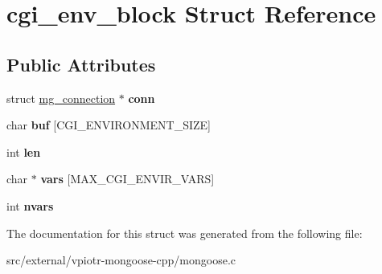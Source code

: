 \hypertarget{structcgi__env__block}{\section{cgi\-\_\-env\-\_\-block Struct Reference}
\label{structcgi__env__block}
}
\subsection*{Public Attributes}
\begin{DoxyCompactItemize}
\item 
\hypertarget{structcgi__env__block_a690d939b7e443d589d89803b36a1a20d}{struct \hyperlink{structmg__connection}{mg\-\_\-connection} $\ast$ {\bfseries conn}}\label{structcgi__env__block_a690d939b7e443d589d89803b36a1a20d}

\item 
\hypertarget{structcgi__env__block_acde439ca8be77fbb1061e760e3688d8d}{char {\bfseries buf} \mbox{[}C\-G\-I\-\_\-\-E\-N\-V\-I\-R\-O\-N\-M\-E\-N\-T\-\_\-\-S\-I\-Z\-E\mbox{]}}\label{structcgi__env__block_acde439ca8be77fbb1061e760e3688d8d}

\item 
\hypertarget{structcgi__env__block_a6455757faba75fde382e24e5bea25cb5}{int {\bfseries len}}\label{structcgi__env__block_a6455757faba75fde382e24e5bea25cb5}

\item 
\hypertarget{structcgi__env__block_a292f1d13d56cd7872284da7221bbd8bb}{char $\ast$ {\bfseries vars} \mbox{[}M\-A\-X\-\_\-\-C\-G\-I\-\_\-\-E\-N\-V\-I\-R\-\_\-\-V\-A\-R\-S\mbox{]}}\label{structcgi__env__block_a292f1d13d56cd7872284da7221bbd8bb}

\item 
\hypertarget{structcgi__env__block_ab409c99d6f905fe2e467aba8aa081fc4}{int {\bfseries nvars}}\label{structcgi__env__block_ab409c99d6f905fe2e467aba8aa081fc4}

\end{DoxyCompactItemize}


The documentation for this struct was generated from the following file\-:\begin{DoxyCompactItemize}
\item 
src/external/vpiotr-\/mongoose-\/cpp/mongoose.\-c\end{DoxyCompactItemize}
